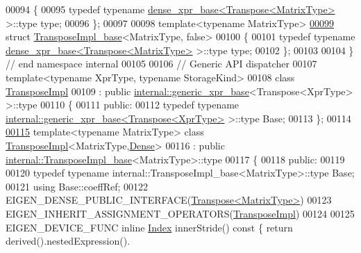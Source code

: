 \begin{DoxyCode}
00094 \{
00095   \textcolor{keyword}{typedef} \textcolor{keyword}{typename} \hyperlink{struct_eigen_1_1internal_1_1dense__xpr__base}{dense\_xpr\_base<Transpose<MatrixType>} >::type type;
00096 \};
00097 
00098 \textcolor{keyword}{template}<\textcolor{keyword}{typename} MatrixType>
\hyperlink{struct_eigen_1_1internal_1_1_transpose_impl__base_3_01_matrix_type_00_01false_01_4}{00099} \textcolor{keyword}{struct }\hyperlink{struct_eigen_1_1internal_1_1_transpose_impl__base}{TransposeImpl\_base}<MatrixType, false>
00100 \{
00101   \textcolor{keyword}{typedef} \textcolor{keyword}{typename} \hyperlink{struct_eigen_1_1internal_1_1dense__xpr__base}{dense\_xpr\_base<Transpose<MatrixType>} >::type type;
00102 \};
00103 
00104 \} \textcolor{comment}{// end namespace internal}
00105 
00106 \textcolor{comment}{// Generic API dispatcher}
00107 \textcolor{keyword}{template}<\textcolor{keyword}{typename} XprType, \textcolor{keyword}{typename} StorageKind>
00108 \textcolor{keyword}{class }\hyperlink{class_eigen_1_1_transpose_impl}{TransposeImpl}
00109   : \textcolor{keyword}{public} \hyperlink{struct_eigen_1_1internal_1_1generic__xpr__base}{internal::generic\_xpr\_base}<Transpose<XprType> >::type
00110 \{
00111 \textcolor{keyword}{public}:
00112   \textcolor{keyword}{typedef} \textcolor{keyword}{typename} \hyperlink{struct_eigen_1_1internal_1_1generic__xpr__base}{internal::generic\_xpr\_base<Transpose<XprType>}
       >::type Base;
00113 \};
00114 
\hyperlink{class_eigen_1_1_transpose_impl_3_01_matrix_type_00_01_dense_01_4}{00115} \textcolor{keyword}{template}<\textcolor{keyword}{typename} MatrixType> \textcolor{keyword}{class }\hyperlink{class_eigen_1_1_transpose_impl}{TransposeImpl}<MatrixType,\hyperlink{struct_eigen_1_1_dense}{Dense}>
00116   : \textcolor{keyword}{public} \hyperlink{struct_eigen_1_1internal_1_1_transpose_impl__base}{internal::TransposeImpl\_base}<MatrixType>::type
00117 \{
00118   \textcolor{keyword}{public}:
00119 
00120     \textcolor{keyword}{typedef} \textcolor{keyword}{typename} internal::TransposeImpl\_base<MatrixType>::type Base;
00121     \textcolor{keyword}{using} Base::coeffRef;
00122     EIGEN\_DENSE\_PUBLIC\_INTERFACE(\hyperlink{group___core___module_class_eigen_1_1_transpose}{Transpose<MatrixType>})
00123     EIGEN\_INHERIT\_ASSIGNMENT\_OPERATORS(\hyperlink{class_eigen_1_1_transpose_impl}{TransposeImpl})
00124 
00125     EIGEN\_DEVICE\_FUNC \textcolor{keyword}{inline} \hyperlink{namespace_eigen_a62e77e0933482dafde8fe197d9a2cfde}{Index} innerStride()\textcolor{keyword}{ const }\{ \textcolor{keywordflow}{return} derived().nestedExpression().

\end{DoxyCode}
